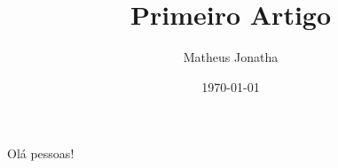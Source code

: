 \documentclass[12pt,a4paper]{article}
\author{Matheus Jonatha}
\date{ \today}
\title{Primeiro Artigo}
\begin{document}
\maketitle

Olá pessoas!
\end{document}
